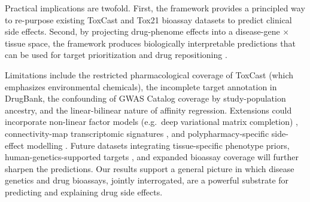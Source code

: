 \documentclass[11pt]{article}
\begin{document}
Practical implications are twofold. First, the framework provides a principled way to re-purpose existing ToxCast and Tox21 bioassay datasets \cite{kavlock2012toxcast,tice2013improving} to predict clinical side effects. Second, by projecting drug-phenome effects into a disease-gene $\times$ tissue space, the framework produces biologically interpretable predictions that can be used for target prioritization and drug repositioning \cite{so2017analysis,kilpinen2016drugreposition,zitnik2018polypharm,nelson2015drug,claussnitzer2020brief}.

Limitations include the restricted pharmacological coverage of ToxCast (which emphasizes environmental chemicals), the incomplete target annotation in DrugBank, the confounding of GWAS Catalog coverage by study-population ancestry, and the linear-bilinear nature of affinity regression. Extensions could incorporate non-linear factor models (e.g.\ deep variational matrix completion) \cite{mazumder2010softimpute}, connectivity-map transcriptomic signatures \cite{duran2016cmap}, and polypharmacy-specific side-effect modelling \cite{zitnik2018polypharm}. Future datasets integrating tissue-specific phenotype priors, human-genetics-supported targets \cite{finan2017drug}, and expanded bioassay coverage will further sharpen the predictions. Our results support a general picture in which disease genetics and drug bioassays, jointly interrogated, are a powerful substrate for predicting and explaining drug side effects.



\end{document}
